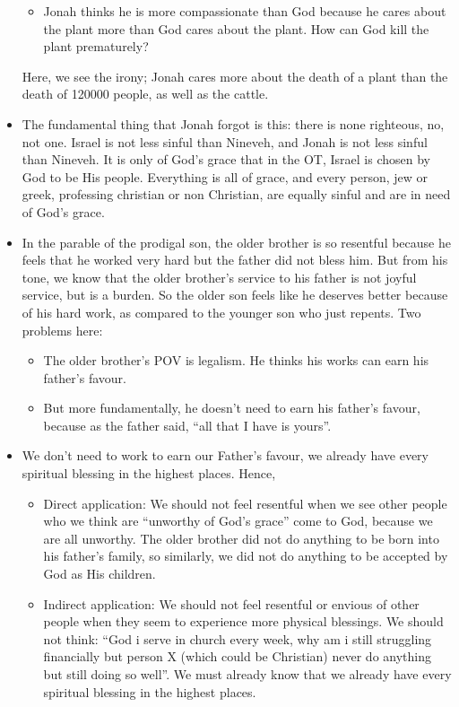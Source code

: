 \begin{itemize}
{\begin{itemize}
    \item{Jonah thinks he is more compassionate than God because he cares about the plant more than God cares about the plant. How can God kill the plant prematurely?}
  \end{itemize}
  Here, we see the irony; Jonah cares more about the death of a plant than
  the death of 120000 people, as well as the cattle. }
  \item{The fundamental thing that Jonah forgot is this: there is none righteous, no, not one. Israel is not less sinful than Nineveh, and Jonah is not less sinful than Nineveh. It is only of God’s grace that in the OT, Israel is chosen by God to be His people. Everything is all of grace, and every person, jew or greek, professing christian or non Christian, are equally sinful and are in need of God’s grace.  }
  \item{In the parable of the prodigal son, the older brother is so resentful because he feels that he worked very hard but the father did not bless him. But from his tone, we know that the older brother’s service to his father is not joyful service, but is a burden. So the older son feels like he deserves better because of his hard work, as compared to the younger son who just repents. Two problems here:
  \begin{itemize}
    \item{The older brother’s POV is legalism. He thinks his works can earn his father’s favour.}
    \item{But more fundamentally, he doesn’t need to earn his father’s favour, because as the father said, “all that I have is yours”.}
  \end{itemize}}
  \item{We don’t need to work to earn our Father’s favour, we already have
  every spiritual blessing in the highest places. Hence, 
  \begin{itemize}
    \item{ Direct application: We should not feel resentful when we see other
    people who we think are “unworthy of God’s grace” come to God, because we
    are all unworthy. The older brother did not do anything to be born into
    his father’s family, so similarly, we did not do anything to be accepted
    by God as His children.}
    \item{Indirect application: We should not feel resentful or envious of other people when they seem to experience more physical blessings. We should not think: “God i serve in church every week, why am i still struggling financially but person X (which could be Christian) never do anything but still doing so well”. We must already know that we already have every spiritual blessing in the highest places.}
  \end{itemize}}


\end{itemize}
